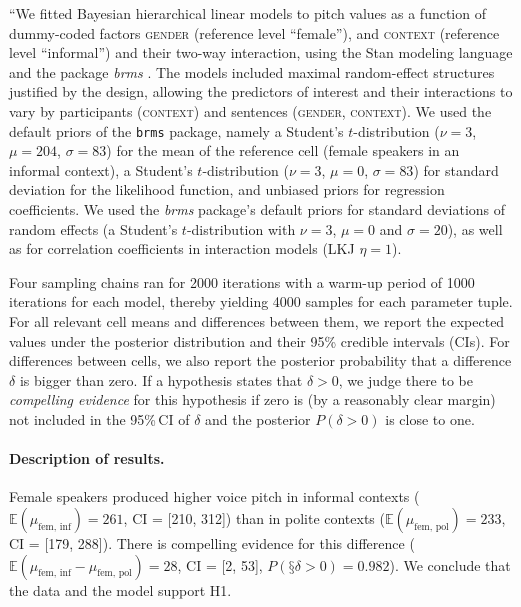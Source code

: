 \documentclass[nobib]{tufte-handout}
\begin{document}
``We fitted Bayesian hierarchical linear models to pitch values as a function of dummy-coded
factors \textsc{gender} (reference level ``female''), and \textsc{context} (reference level
``informal'') and their two-way interaction, using the Stan modeling language
\citep{carpenter2016stan} and the package \emph{brms} \citep{buerkner2016brms}. The models
included maximal random-effect structures justified by the design, allowing the predictors of
interest and their interactions to vary by participants (\textsc{context}) and sentences
(\textsc{gender}, \textsc{context}). We used the default priors of the \texttt{brms} package,
namely a Student's $t$-distribution ($\nu = 3$, $\mu = 204$, $\sigma = 83$) for the mean of the
reference cell (female speakers in an informal context), a Student's $t$-distribution ($\nu =
3$, $\mu = 0$, $\sigma = 83$) for standard deviation for the likelihood function, and unbiased
priors for regression coefficients. We used the \textit{brms} package's default priors for
standard deviations of random effects (a Student's $t$-distribution with $\nu = 3$, $\mu = 0$
and $\sigma = 20$), as well as for correlation coefficients in interaction models (LKJ $\eta =
1$).

Four sampling chains ran for 2000 iterations with a warm-up period of 1000 iterations for each
model, thereby yielding 4000 samples for each parameter tuple. For all relevant cell means and differences
between them, we report the expected values under the posterior distribution and their 95\%
credible intervals (CIs). For differences between cells, we also report the posterior
probability that a difference $\delta$ is bigger than zero. If a hypothesis states that
$\delta >0$, we judge there to be \emph{compelling evidence} for this hypothesis if zero is (by
a reasonably clear margin) not included in the 95\%\,CI of $\delta$ and the posterior $P(\delta
>0)$ is close to one.

\paragraph{Description of results.}  

Female speakers produced higher voice pitch in informal contexts ($\mathbb{E}(\mu_{\text{fem,
    inf}}) = 261$, CI = [210, 312]) than in polite contexts ($\mathbb{E}(\mu_{\text{fem,
    pol}}) = 233$, CI = [179, 288]). There is compelling evidence for this difference
($\mathbb{E}(\mu_{\text{fem, inf}} - \mu_{\text{fem, pol}}) = 28$, CI = [2, 53], $P(§\delta
> 0) = 0.982$). We conclude that the data and the model support H1.
%
\end{document}
